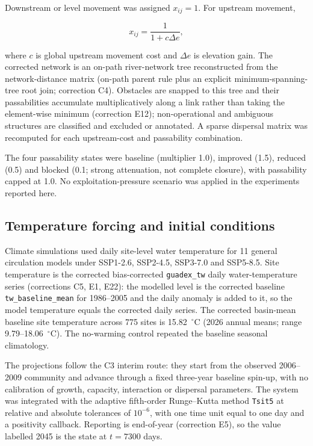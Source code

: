 \documentclass[11pt,a4paper]{article}
\begin{document}
Downstream or level movement was assigned $x_{ij}=1$. For upstream movement,

\begin{equation}
x_{ij}=\frac{1}{1+c\Delta e},
\end{equation}

where $c$ is global upstream movement cost and $\Delta e$ is elevation gain. The corrected network is an on-path river-network tree reconstructed from the network-distance matrix (on-path parent rule plus an explicit minimum-spanning-tree root join; correction C4). Obstacles are snapped to this tree and their passabilities accumulate multiplicatively along a link rather than taking the element-wise minimum (correction E12); non-operational and ambiguous structures are classified and excluded or annotated. A sparse dispersal matrix was recomputed for each upstream-cost and passability combination.

The four passability states were baseline (multiplier 1.0), improved (1.5), reduced (0.5) and blocked (0.1; strong attenuation, not complete closure), with passability capped at 1.0. No exploitation-pressure scenario was applied in the experiments reported here.

\subsection{Temperature forcing and initial conditions}

Climate simulations used daily site-level water temperature for 11 general circulation models under SSP1-2.6, SSP2-4.5, SSP3-7.0 and SSP5-8.5. Site temperature is the corrected bias-corrected \texttt{guadex\_tw} daily water-temperature series (corrections C5, E1, E22): the modelled level is the corrected baseline \texttt{tw\_baseline\_mean} for 1986--2005 and the daily anomaly is added to it, so the model temperature equals the corrected daily series. The corrected basin-mean baseline site temperature across 775 sites is 15.82~$^\circ$C (2026 annual means; range 9.79--18.06~$^\circ$C). The no-warming control repeated the baseline seasonal climatology.

The projections follow the C3 interim route: they start from the observed 2006--2009 community and advance through a fixed three-year baseline spin-up, with no calibration of growth, capacity, interaction or dispersal parameters. The system was integrated with the adaptive fifth-order Runge--Kutta method \texttt{Tsit5} at relative and absolute tolerances of $10^{-6}$, with one time unit equal to one day and a positivity callback. Reporting is end-of-year (correction E5), so the value labelled 2045 is the state at $t=7300$ days.
\end{document}
